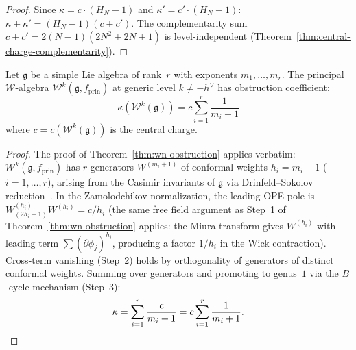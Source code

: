 \begin{proof}
Since $\kappa = c \cdot (H_N - 1)$ and $\kappa' = c' \cdot (H_N - 1)$:
$\kappa + \kappa' = (H_N - 1)(c + c')$.
The complementarity sum $c + c' = 2(N{-}1)(2N^2{+}2N{+}1)$
is level-independent
(Theorem~\ref{thm:central-charge-complementarity}).
\end{proof}

\begin{corollary}
\label{cor:general-w-obstruction}
Let $\mathfrak{g}$ be a simple Lie algebra of rank~$r$ with exponents $m_1, \ldots, m_r$.  The principal $\mathcal{W}$-algebra $\mathcal{W}^k(\mathfrak{g}, f_{\mathrm{prin}})$ at generic level $k \neq -h^\vee$ has obstruction coefficient:
\begin{equation}\label{eq:general-w-kappa}
\kappa(\mathcal{W}^k(\mathfrak{g})) = c \sum_{i=1}^{r} \frac{1}{m_i + 1}
\end{equation}
where $c = c(\mathcal{W}^k(\mathfrak{g}))$ is the central charge.
\end{corollary}

\begin{proof}
The proof of Theorem~\ref{thm:wn-obstruction} applies verbatim: $\mathcal{W}^k(\mathfrak{g}, f_{\mathrm{prin}})$ has $r$ generators $W^{(m_i + 1)}$ of conformal weights $h_i = m_i + 1$ ($i = 1, \ldots, r$), arising from the Casimir invariants of $\mathfrak{g}$ via Drinfeld--Sokolov reduction~\cite{FL88}.  In the Zamolodchikov normalization, the leading OPE pole is $W^{(h_i)}_{(2h_i - 1)} W^{(h_i)} = c/h_i$ (the same free field argument as Step~1 of Theorem~\ref{thm:wn-obstruction} applies: the Miura transform gives $W^{(h_i)}$ with leading term $\sum (\partial\phi_j)^{h_i}$, producing a factor $1/h_i$ in the Wick contraction).  Cross-term vanishing (Step~2) holds by orthogonality of generators of distinct conformal weights.  Summing over generators and promoting to genus~$1$ via the $B$-cycle mechanism (Step~3):
\[
\kappa = \sum_{i=1}^{r} \frac{c}{m_i + 1} = c \sum_{i=1}^{r} \frac{1}{m_i + 1}. \qedhere
\]
\end{proof}

